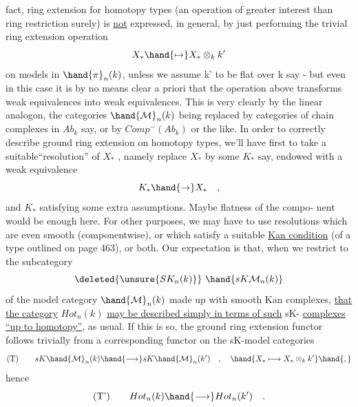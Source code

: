 fact,  ring extension for homotopy types (an operation of greater interest
than ring restriction surely) is \uline{not} expressed,  in general,  by just
performing the trivial ring extension operation
\[ X_{*} \hand{\mapsto} X_{*} \otimes_{k} k' \]
on models in $\hand{\pi}_{n}(k)$,  unless we assume k' to be flat over k say  -  but
even in this case it is by no means clear a priori that the operation
above transforms weak equivalences into weak equivalences.  This is very
clearly  by the linear analogon,  the categories $\hand{\mathcal{M}}_{n}(k)$  being
replaced by  categories of chain complexes in  $Ab_{k}$ say,  or by $Comp^{-}(Ab_{k})$
or the like.   In order to correctly describe ground ring extension on
homotopy types,  we'll have first to take a suitable``resolution'' of $X_{*}$ ,
namely replace $X_{*}$  by some  $K_{*}$  say,  endowed with a weak equivalence
\[ K_{*} \hand{\to} X_{*} \quad , \]
and $K_{*}$ satisfying some extra assumptions.  Maybe flatness of the compo-%
nent would be enough here.  For other purposes,  we may have to use
resolutions which are even smooth (componentwise),  or which satisfy a
suitable \uline{Kan condition}  (of a type outlined on page 463),  or both.
Our expectation is that,  when we restrict to the subcategory
\[ \deleted{\unsure{SK_{n}(k)}} \ \hand{sK\mathcal{M}_{n}(k)} \]
of the model category $\hand{\mathcal{M}}_{n}(k)$ made up with smooth Kan complexes,  \uline{that}
\uline{the category} $Hot_{n}(k)$  \uline{may be described simply in  terms of such}  sK-%
\uline{complexes} \uline{``up to h\hand{$\smile$}omotopy''},  as usual.  If this is so,  the ground ring
extension functor   follows trivially from a corresponding functor on
the  sK-model categories
\[ \text{(T)} \qquad sK\hand{\mathcal{M}}_{n}(k) \hand{\longrightarrow} sK\hand{\mathcal{M}}_{n}(k') \quad , \quad \hand{X_{*} \longmapsto X_{*} \otimes_{k} k'} \hand{,} \]
hence
\[ \text{(T')} \qquad Hot_{n}(k) \hand{\longrightarrow} Hot_{n}(k') \quad . \]

